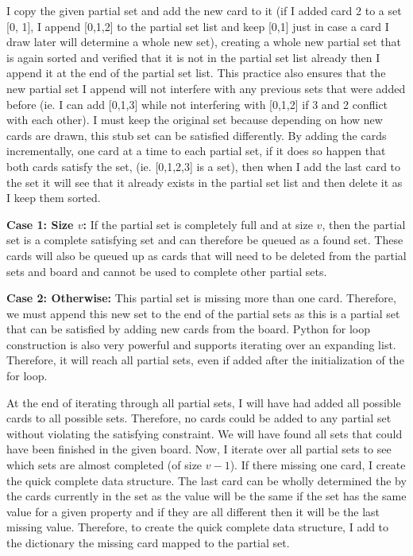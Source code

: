 \documentclass[pageno]{jpaper}
\begin{document}
I copy the given partial set and add the new card to it (if I added card 2 to a set [0, 1], I append [0,1,2] to the partial set list and keep [0,1] just in case a card I draw later will determine a whole new set), creating a whole new partial set that is again sorted and verified that it is not in the partial set list already then I append it at the end of the partial set list. This practice also ensures that the new partial set I append will not interfere with any previous sets that were added before (ie. I can add [0,1,3] while not interfering with [0,1,2] if 3 and 2 conflict with each other). I must keep the original set because depending on how new cards are drawn, this stub set can be satisfied differently. By adding the cards incrementally, one card at a time to each partial set, if it does so happen that both cards satisfy the set, (ie. [0,1,2,3] is a set), then when I add the last card to the set it will see that it already exists in the partial set list and then delete it as I keep them sorted.

\textbf{Case 1: Size $v$:} If the partial set is completely full and at size $v$, then the partial set is a complete satisfying set and can therefore be queued as a found set. These cards will also be queued up as cards that will need to be deleted from the partial sets and board and cannot be used to complete other partial sets.

\textbf{Case 2: Otherwise:} This partial set is missing more than one card. Therefore, we must append this new set to the end of the partial sets as this is a partial set that can be satisfied by adding new cards from the board. Python for loop construction is also very powerful and supports iterating over an expanding list. Therefore, it will reach all partial sets, even if added after the initialization of the for loop. 

At the end of iterating through all partial sets, I will have had added all possible cards to all possible sets. Therefore, no cards could be added to any partial set without violating the satisfying constraint. We will have found all sets that could have been finished in the given board. Now, I iterate over all partial sets to see which sets are almost completed (of size $v-1$). If there missing one card, I create the quick complete data structure. The last card can be wholly determined the by the cards currently in the set as the value will be the same if the set has the same value for a given property and if they are all different then it will be the last missing value. Therefore, to create the quick complete data structure, I add to the dictionary the missing card mapped to the partial set. 
\end{document}
